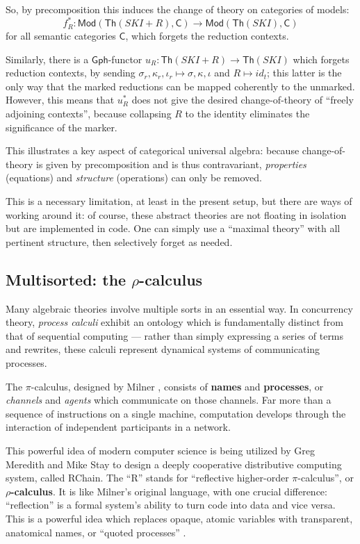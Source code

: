 \documentclass{amsart}
\theoremstyle{definition}
\newcommand{\Th}{\mathsf{Th}}
\newcommand{\Gph}{\mathsf{Gph}}
\newcommand{\Mod}{\mathsf{Mod}}
\newcommand{\C}{\mathsf{C}}
\newcommand{\maps}{\colon}
\begin{document}
So, by precomposition this induces the change of theory on categories of models: $$f_R^*\maps \Mod(\Th(SKI+R),\C) \to \Mod(\Th(SKI),\C)$$ for all semantic categories $\C$, which forgets the reduction contexts.

Similarly, there is a $\Gph$-functor $u_R\maps \Th(SKI+R)\to \Th(SKI)$ which forgets reduction contexts, by sending $\sigma_r,\kappa_r,\iota_r \mapsto\sigma, \kappa,\iota$ and $R \mapsto id_t$; this latter is the only way that the marked reductions can be mapped coherently to the unmarked. However, this means that $u_R^*$ does not give the desired change-of-theory of ``freely adjoining contexts'', because collapsing $R$ to the identity eliminates the significance of the marker.

This illustrates a key aspect of categorical universal algebra: because change-of-theory is given by precomposition and is thus contravariant, \textit{properties} (equations) and \textit{structure} (operations) can only be removed.

This is a necessary limitation, at least in the present setup, but there are ways of working around it: of course, these abstract theories are not floating in isolation but are implemented in code. One can simply use a ``maximal theory'' with all pertinent structure, then selectively forget as needed.

\subsection{Multisorted: the $\rho$-calculus}

Many algebraic theories involve multiple sorts in an essential way. In concurrency theory, \textit{process calculi} exhibit an ontology which is fundamentally distinct from that of sequential computing --- rather than simply expressing a series of terms and rewrites, these calculi represent dynamical systems of communicating processes.

The $\pi$-calculus, designed by Milner \cite{milner}, consists of \textbf{names} and \textbf{processes}, or \textit{channels} and \textit{agents} which communicate on those channels. Far more than a sequence of instructions on a single machine, computation develops through the interaction of independent participants in a network.

This powerful idea of modern computer science is being utilized by Greg Meredith and Mike Stay to design a deeply cooperative distributive computing system, called RChain. The ``R'' stands for ``reflective higher-order $\pi$-calculus'', or \textbf{$\rho$-calculus}. It is like Milner's original language, with one crucial difference: ``reflection'' is a formal system's ability to turn code into data and vice versa. This is a powerful idea which replaces opaque, atomic variables with transparent, anatomical names, or ``quoted processes'' \cite{refl}.
\end{document}
